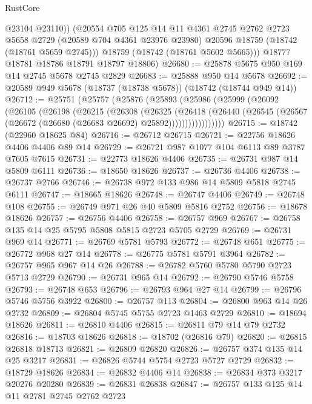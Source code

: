 \begin{lexlean}{RustCore}
\begin{coremodule}
            @23104
            @23110))
        (@20554
          @705
          @125
          @14
          @11
          @4361
          @2745
          @2762
          @2723
          @5658
          @2729
          (@20589 @704 @4361 @23976 @23980)
          @20596
          @18759
          (@18742 (@18761 @5659 @2745)))
        @18759
        (@18742 (@18761 @5602 @5665)))
      @18777
      @18781
      @18786
      @18791
      @18797
      @18806)
@26680 := @25878 @5675 @950 @169 @14 @2745 @5678 @2745 @2829
@26683 := @25888 @950 @14 @5678
@26692 := @20589 @949 @5678 (@18737 (@18738 @5678)) (@18742 (@18744 @949 @14))
@26712 := @25751
    (@25757
      (@25876
        (@25893
          (@25986
            (@25999
              (@26092
                (@26105
                  (@26198
                    (@26215
                      (@26308
                        (@26325
                          (@26418
                            (@26440
                              (@26545
                                (@26567 (@26672 (@26680 (@26683 @26692) @25892)))))))))))))))))
@26715 := @18742 (@22960 @18625 @84)
@26716 := @26712 @26715
@26721 := @22756 @18626 @4406 @4406 @89 @14
@26729 := @26721 @987 @1077 @104 @6113 @89 @3787 @7605 @7615
@26731 := @22773 @18626 @4406
@26735 := @26731 @987 @14 @5809 @6111
@26736 := @18650 @18626
@26737 := @26736 @4406
@26738 := @26737 @2766
@26746 := @26738 @972 @133 @986 @14 @5809 @5818 @2745 @6111
@26747 := @18665 @18626
@26748 := @26747 @4406
@26749 := @26748 @108
@26755 := @26749 @971 @26 @40 @5809 @5816 @2752
@26756 := @18678 @18626
@26757 := @26756 @4406
@26758 := @26757 @969
@26767 := @26758 @135 @14 @25 @5795 @5808 @5815 @2723 @5705 @2729
@26769 := @26731 @969 @14
@26771 := @26769 @5781 @5793
@26772 := @26748 @651
@26775 := @26772 @968 @27 @14
@26778 := @26775 @5781 @5791 @3964
@26782 := @26757 @965 @967 @14 @26
@26788 := @26782 @5760 @5780 @5790 @2723 @5713 @2729
@26790 := @26731 @965 @14
@26792 := @26790 @5746 @5758
@26793 := @26748 @653
@26796 := @26793 @964 @27 @14
@26799 := @26796 @5746 @5756 @3922
@26800 := @26757 @113
@26804 := @26800 @963 @14 @26 @2732
@26809 := @26804 @5745 @5755 @2723 @1463 @2729
@26810 := @18694 @18626
@26811 := @26810 @4406
@26815 := @26811 @79 @14 @79 @2732
@26816 := @18703 @18626
@26818 := @18702 (@26816 @79)
@26820 := @26815 @26818 @18713
@26821 := @26809 @26820
@26826 := @26757 @374 @135 @14 @25 @3217
@26831 := @26826 @5744 @5754 @2723 @5727 @2729
@26832 := @18729 @18626
@26834 := @26832 @4406 @14
@26838 := @26834 @373 @3217 @20276 @20280
@26839 := @26831 @26838
@26847 := @26757 @133 @125 @14 @11 @2781 @2745 @2762 @2723

\end{coremodule}
\end{lexlean}
